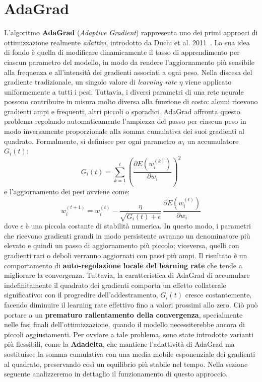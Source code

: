 \section{AdaGrad}

L’algoritmo \textbf{AdaGrad} (\textit{Adaptive Gradient}) rappresenta uno dei primi approcci di ottimizzazione realmente \textit{adattivi}, introdotto da Duchi et al. 2011~\cite{DuchiHazanSinger2011AdaGrad}. La sua idea di fondo è quella di modificare dinamicamente il tasso di apprendimento per ciascun parametro del modello, in modo da rendere l’aggiornamento più sensibile alla frequenza e all’intensità dei gradienti associati a ogni peso. Nella discesa del gradiente tradizionale, un singolo valore di \textit{learning rate} $\eta$ viene applicato uniformemente a tutti i pesi. Tuttavia, i diversi parametri di una rete neurale possono contribuire in misura molto diversa alla funzione di costo: alcuni ricevono gradienti ampi e frequenti, altri piccoli o sporadici. AdaGrad affronta questo problema regolando automaticamente l’ampiezza del passo per ciascun peso in modo inversamente proporzionale alla somma cumulativa dei suoi gradienti al quadrato. Formalmente, si definisce per ogni parametro $w_i$ un accumulatore $G_i(t)$:
\[
G_i(t) = \sum_{k=1}^{t} \left( \frac{\partial E(w_i^{(k)})}{\partial w_i} \right)^2
\]
e l’aggiornamento dei pesi avviene come:
\[
w_i^{(t+1)} = w_i^{(t)} - \frac{\eta}{\sqrt{G_i(t) + \epsilon}} \, \frac{\partial E(w_i^{(t)})}{\partial w_i}
\]
dove $\epsilon$ è una piccola costante di stabilità numerica. In questo modo, i parametri che ricevono gradienti grandi in modo persistente avranno un denominatore più elevato e quindi un passo di aggiornamento più piccolo; viceversa, quelli con gradienti rari o deboli verranno aggiornati con passi più ampi. Il risultato è un comportamento di \textbf{auto-regolazione locale del learning rate} che tende a migliorare la convergenza. Tuttavia, la caratteristica di AdaGrad di accumulare indefinitamente il quadrato dei gradienti comporta un effetto collaterale significativo: con il progredire dell’addestramento, $G_i(t)$ cresce costantemente, facendo diminuire il learning rate effettivo fino a valori prossimi allo zero.  
Ciò può portare a un \textbf{prematuro rallentamento della convergenza}, specialmente nelle fasi finali dell’ottimizzazione, quando il modello necessiterebbe ancora di piccoli aggiustamenti. Per ovviare a tale problema, sono state introdotte varianti più flessibili, come la \textbf{Adadelta}, che mantiene l’adattività di AdaGrad ma sostituisce la somma cumulativa con una media mobile esponenziale dei gradienti al quadrato, preservando così un equilibrio più stabile nel tempo. Nella sezione seguente analizzeremo in dettaglio il funzionamento di questo approccio.

